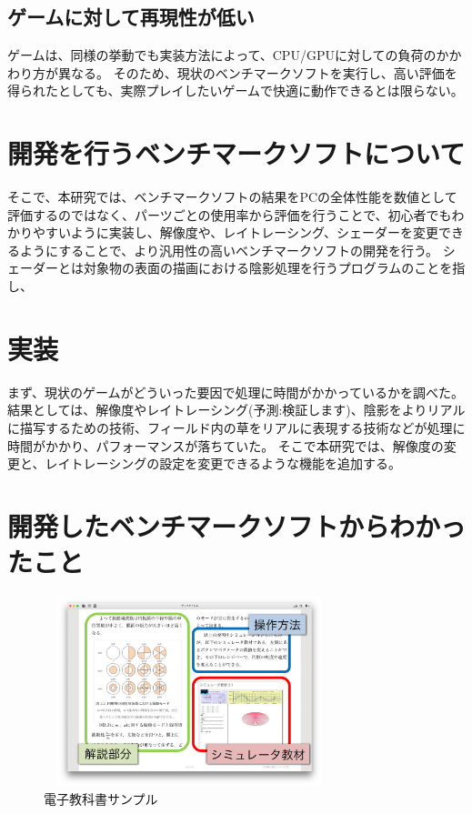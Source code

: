 \documentclass[twocolumn,10pt,a4j]{ltjsarticle}
\begin{document}
 \subsection{ゲームに対して再現性が低い}
ゲームは、同様の挙動でも実装方法によって、CPU/GPUに対しての負荷のかかわり方が異なる。
そのため、現状のベンチマークソフトを実行し、高い評価を得られたとしても、実際プレイしたいゲームで快適に動作できるとは限らない。

\section{開発を行うベンチマークソフトについて}
そこで、本研究では、ベンチマークソフトの結果をPCの全体性能を数値として評価するのではなく、パーツごとの使用率から評価を行うことで、初心者でもわかりやすいように実装し、解像度や、レイトレーシング、シェーダーを変更できるようにすることで、より汎用性の高いベンチマークソフトの開発を行う。
シェーダーとは対象物の表面の描画における陰影処理を行うプログラムのことを指し、

\section{実装}
まず、現状のゲームがどういった要因で処理に時間がかかっているかを調べた。
結果としては、解像度やレイトレーシング(予測:検証します)、陰影をよりリアルに描写するための技術、フィールド内の草をリアルに表現する技術などが処理に時間がかかり、パフォーマンスが落ちていた。
そこで本研究では、解像度の変更と、レイトレーシングの設定を変更できるような機能を追加する。

\section{開発したベンチマークソフトからわかったこと}



\begin{figure}[h]
\begin{center}
 \includegraphics[clip,width=85mm,height=55mm]{textbook.pdf}
\end{center}
 \caption{電子教科書サンプル}
 \label{fig:教科書}
\end{figure}
\end{document}
